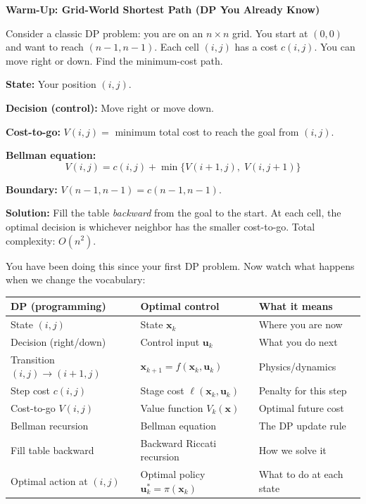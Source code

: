 \vspace{0.5em}
\begin{mdframed}[linewidth=1pt, innertopmargin=10pt, innerbottommargin=10pt]
\textbf{Warm-Up: Grid-World Shortest Path (DP You Already Know)}

\vspace{0.3em}
Consider a classic DP problem: you are on an $n \times n$ grid. You start at $(0, 0)$ and want to reach $(n{-}1, n{-}1)$. Each cell $(i, j)$ has a cost $c(i, j)$. You can move right or down. Find the minimum-cost path.

\textbf{State:} Your position $(i, j)$.

\textbf{Decision (control):} Move right or move down.

\textbf{Cost-to-go:} $V(i, j) = $ minimum total cost to reach the goal from $(i, j)$.

\textbf{Bellman equation:}
\[
V(i, j) = c(i, j) + \min\{V(i+1, j), \; V(i, j+1)\}
\]

\textbf{Boundary:} $V(n{-}1, n{-}1) = c(n{-}1, n{-}1)$.

\textbf{Solution:} Fill the table \textit{backward} from the goal to the start. At each cell, the optimal decision is whichever neighbor has the smaller cost-to-go. Total complexity: $O(n^2)$.

You have been doing this since your first DP problem. Now watch what happens when we change the vocabulary:

\begin{center}
\begin{tabular}{lll}
\toprule
\textbf{DP (programming)} & \textbf{Optimal control} & \textbf{What it means} \\
\midrule
State $(i, j)$ & State $\mathbf{x}_k$ & Where you are now \\
Decision (right/down) & Control input $\mathbf{u}_k$ & What you do next \\
Transition $(i,j) \to (i+1,j)$ & $\mathbf{x}_{k+1} = f(\mathbf{x}_k, \mathbf{u}_k)$ & Physics/dynamics \\
Step cost $c(i,j)$ & Stage cost $\ell(\mathbf{x}_k, \mathbf{u}_k)$ & Penalty for this step \\
Cost-to-go $V(i,j)$ & Value function $V_k(\mathbf{x})$ & Optimal future cost \\
Bellman recursion & Bellman equation & The DP update rule \\
Fill table backward & Backward Riccati recursion & How we solve it \\
Optimal action at $(i,j)$ & Optimal policy $\mathbf{u}_k^* = \pi(\mathbf{x}_k)$ & What to do at each state \\
\bottomrule
\end{tabular}
\end{center}


\end{mdframed}
